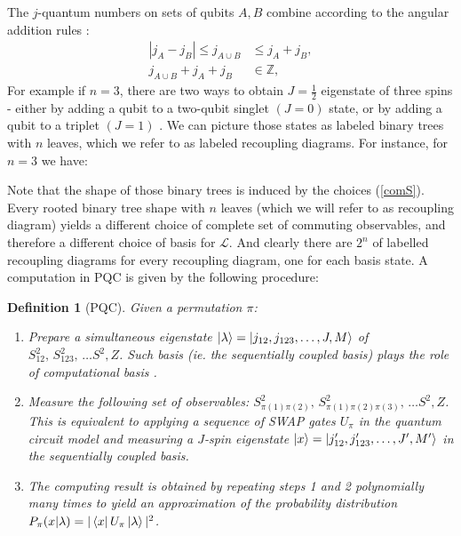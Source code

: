 \documentclass{article}
\newtheorem{definition}{Definition}
\begin{document}
The $j$-quantum numbers on sets of qubits $A,B$ combine according to the angular addition rules \cite{Woit17}: 
\begin{align*}
|j_A - j_B| \leq j_{A \cup B} &\leq j_A + j_B, \\
j_{A \cup B} + j_A + j_B & \in \mathbb{Z},
\end{align*}
For example if $n=3$, there are two ways to obtain $J=\frac{1}{2}$ eigenstate of three spins - either by adding a qubit to a two-qubit singlet $(J=0)$ state, or by adding a qubit to a triplet $(J=1)$ \cite{Pauncz67}.
We can picture those states as labeled binary trees with $n$ leaves, which we refer to as labeled recoupling diagrams. For instance, for $n=3$ we have:

Note that the shape of those binary trees is induced by the choices (\ref{comS}). Every rooted binary tree shape with $n$ leaves (which we will refer to as recoupling diagram) yields a different choice of complete set of commuting observables, and therefore a different choice of basis for $\mathcal{L}$. And clearly there are $2^n$ of labelled recoupling diagrams for every recoupling diagram, one for each basis state.
A computation in PQC is given by the following procedure:
\begin{definition}[PQC]\label{pqcomputation} 
	Given a permutation $\pi$: %
	\begin{enumerate}
		\item Prepare a simultaneous eigenstate $\ket{\lambda} = \ket{j_{12}, j_{123}, \ldots, J, M}$ of $ S_{12}^2, \, S_{123}^2, \, \ldots S^2, Z$. Such basis (ie. the sequentially coupled basis) plays the role of computational basis .  %
		\item Measure the following  set of observables: $S_{ \pi(1)\pi(2) }^2, \, S_{ \pi(1)\pi(2)\pi(3) }^2, \, \ldots S^2, Z$. This is equivalent to applying a sequence of \textsf{SWAP} gates $U_\pi$ in the quantum circuit model and measuring a $J$-spin eigenstate $\ket{x} = \ket{j_{12}', j_{123}', \ldots, J', M'}$ in the sequentially coupled basis.	
		\item The computing result is obtained by repeating steps 1 and 2 polynomially many times to yield an approximation of the probability distribution $P_\pi (x|\lambda) = | \bra{x} U_\pi \ket{\lambda}|^2 $.
	\end{enumerate}
\end{definition}
\end{document}
